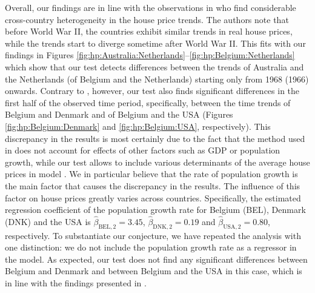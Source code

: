 \documentclass[12pt]{article}
\makeatletter
\renewcommand{\eqref}[1]{\tagform@{\ref{#1}}}
\makeatother
\begin{document}
Overall, our findings are in line with the observations in \cite{Knoll2017} who find considerable cross-country heterogeneity in the house price trends. The authors note that before World War II, the countries exhibit similar trends in real house prices, while the trends start to diverge sometime after World War II. This fits with our findings in Figures \ref{fig:hp:Australia:Netherlands}--\ref{fig:hp:Belgium:Netherlands} which show that our test detects differences between the trends of Australia and the Netherlands (of Belgium and the Netherlands) starting only from 1968 (1966) onwards. Contrary to \cite{Knoll2017}, however, our test also finds significant differences in the first half of the observed time period, specifically, between the time trends of Belgium and Denmark and of Belgium and the USA (Figures \ref{fig:hp:Belgium:Denmark} and \ref{fig:hp:Belgium:USA}, respectively). This discrepancy in the results is most certainly due to the fact that the method used in \cite{Knoll2017} does not account for effects of other factors such as GDP or population growth, while our test allows to include various determinants of the average house prices in model \eqref{eq:model:app4}. We in particular believe that the rate of population growth is the main factor that causes the discrepancy in the results. The influence of this factor on house prices greatly varies across countries. Specifically, the estimated regression coefficient of the population growth rate for Belgium (BEL), Denmark (DNK) and the USA is $\widehat{\beta}_{\text{BEL}, 2} = 3.45$, $\widehat{\beta}_{\text{DNK}, 2} = 0.19$ and $\widehat{\beta}_{\text{USA}, 2} = 0.80$, respectively. To substantiate our conjecture, we have repeated the analysis with one distinction: we do not include the population growth rate as a regressor in the model. As expected, our test does not find any significant differences between Belgium and Denmark and between Belgium and the USA in this case, which is in line with the findings presented in \cite{Knoll2017}. 
\end{document}
